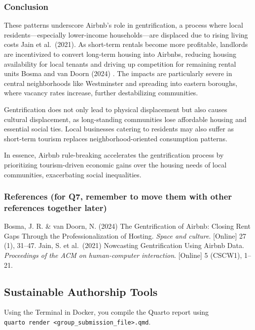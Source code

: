 \documentclass[
  a4paper,
  DIV=11,
  numbers=noendperiod]{scrartcl}
\begin{document}
\subsubsection{Conclusion}\label{conclusion}

These patterns underscore Airbnb's role in gentrification, a process
where local residents---especially lower-income households---are
displaced due to rising living costs Jain et al.~(2021). As short-term
rentals become more profitable, landlords are incentivized to convert
long-term housing into Airbnbs, reducing housing availability for local
tenants and driving up competition for remaining rental units Bosma and
van Doorn (2024) . The impacts are particularly severe in central
neighborhoods like Westminster and spreading into eastern boroughs,
where vacancy rates increase, further destabilizing communities.

Gentrification does not only lead to physical displacement but also
causes cultural displacement, as long-standing communities lose
affordable housing and essential social ties. Local businesses catering
to residents may also suffer as short-term tourism replaces
neighborhood-oriented consumption patterns.

In essence, Airbnb rule-breaking accelerates the gentrification process
by prioritizing tourism-driven economic gains over the housing needs of
local communities, exacerbating social inequalities.

\subsubsection{References (for Q7, remember to move them with other
references together
later)}\label{references-for-q7-remember-to-move-them-with-other-references-together-later}

Bosma, J. R. \& van Doorn, N. (2024) The Gentrification of Airbnb:
Closing Rent Gaps Through the Professionalization of Hosting.
\emph{Space and culture}. {[}Online{]} 27 (1), 31--47. Jain, S. et
al.~(2021) Nowcasting Gentrification Using Airbnb Data.
\emph{Proceedings of the ACM on human-computer interaction}.
{[}Online{]} 5 (CSCW1), 1--21.

\subsection{Sustainable Authorship
Tools}\label{sustainable-authorship-tools}

Using the Terminal in Docker, you compile the Quarto report using
\texttt{quarto\ render\ \textless{}group\_submission\_file\textgreater{}.qmd}.
\end{document}
